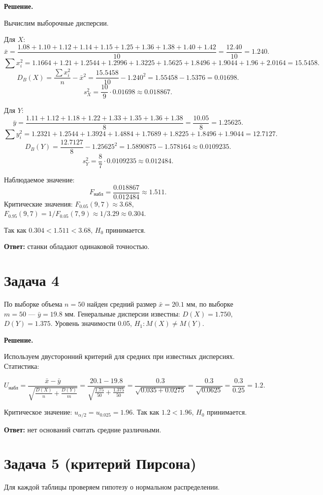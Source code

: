 \documentclass[a4paper,14pt]{article}
\begin{document}
\textbf{Решение.}

Вычислим выборочные дисперсии.

Для \( X \):
\[
\bar{x} = \frac{1.08+1.10+1.12+1.14+1.15+1.25+1.36+1.38+1.40+1.42}{10} = \frac{12.40}{10} = 1.240.
\]
\[
\sum x_i^2 = 1.1664+1.21+1.2544+1.2996+1.3225+1.5625+1.8496+1.9044+1.96+2.0164 = 15.5458.
\]
\[
D_B(X) = \frac{\sum x_i^2}{n} - \bar{x}^2 = \frac{15.5458}{10} - 1.240^2 = 1.55458 - 1.5376 = 0.01698.
\]
\[
s_X^2 = \frac{10}{9} \cdot 0.01698 \approx 0.018867.
\]

Для \( Y \):
\[
\bar{y} = \frac{1.11+1.12+1.18+1.22+1.33+1.35+1.36+1.38}{8} = \frac{10.05}{8} = 1.25625.
\]
\[
\sum y_i^2 = 1.2321+1.2544+1.3924+1.4884+1.7689+1.8225+1.8496+1.9044 = 12.7127.
\]
\[
D_B(Y) = \frac{12.7127}{8} - 1.25625^2 = 1.5890875 - 1.578164 \approx 0.0109235.
\]
\[
s_Y^2 = \frac{8}{7} \cdot 0.0109235 \approx 0.012484.
\]

Наблюдаемое значение:
\[
F_{\text{набл}} = \frac{0.018867}{0.012484} \approx 1.511.
\]
Критические значения: \( F_{0.05}(9,7) \approx 3.68 \), \( F_{0.95}(9,7) = 1/F_{0.05}(7,9) \approx 1/3.29 \approx 0.304 \).

Так как \( 0.304 < 1.511 < 3.68 \), \( H_0 \) принимается.

\textbf{Ответ:} станки обладают одинаковой точностью.

\section*{Задача 4}
По выборке объема \( n = 50 \) найден средний размер \( \bar{x} = 20.1 \) мм, по выборке \( m = 50 \) — \( \bar{y} = 19.8 \) мм. Генеральные дисперсии известны: \( D(X) = 1.750 \), \( D(Y) = 1.375 \). Уровень значимости 0.05, \( H_1: M(X) \neq M(Y) \).

\textbf{Решение.}

Используем двусторонний критерий для средних при известных дисперсиях. Статистика:

\[
U_{\text{набл}} = \frac{\bar{x} - \bar{y}}{\sqrt{\frac{D(X)}{n} + \frac{D(Y)}{m}}} = \frac{20.1 - 19.8}{\sqrt{\frac{1.75}{50} + \frac{1.375}{50}}} = \frac{0.3}{\sqrt{0.035 + 0.0275}} = \frac{0.3}{\sqrt{0.0625}} = \frac{0.3}{0.25} = 1.2.
\]

Критическое значение: \( u_{\alpha/2} = u_{0.025} = 1.96 \). Так как \( 1.2 < 1.96 \), \( H_0 \) принимается.

\textbf{Ответ:} нет оснований считать средние различными.

\section*{Задача 5 (критерий Пирсона)}
Для каждой таблицы проверяем гипотезу о нормальном распределении.
\end{document}
